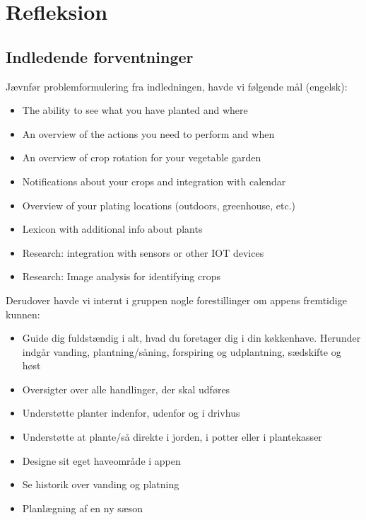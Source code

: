 \section{Refleksion}

\subsection{Indledende forventninger}
Jævnfør problemformulering fra indledningen, havde vi følgende mål (engelsk):

\begin{itemize}
        \item
    The ability to see what you have planted and where
        \item
    An overview of the actions you need to perform and when
        \item
    An overview of crop rotation for your vegetable garden
        \item
    Notifications about your crops and integration with calendar
        \item
    Overview of your plating locations (outdoors, greenhouse, etc.)
        \item
    Lexicon with additional info about plants 
        \item
    Research: integration with sensors or other IOT devices
        \item
    Research: Image analysis for identifying crops
\end{itemize}

Derudover havde vi internt i gruppen nogle forestillinger om appens fremtidige kunnen:

\begin{itemize}
    \item Guide dig fuldstændig i alt, hvad du foretager dig i din køkkenhave. Herunder indgår vanding, plantning/såning, forspiring og udplantning, sædskifte og høst
    \item Oversigter over alle handlinger, der skal udføres
    \item Understøtte planter indenfor, udenfor og i drivhus
    \item Understøtte at plante/så direkte i jorden, i potter eller i plantekasser
    \item Designe sit eget haveområde i appen
    \item Se historik over vanding og platning
    \item Planlægning af en ny sæson
\end{itemize}

